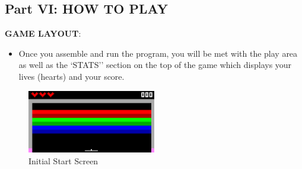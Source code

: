 \documentclass{article}
\begin{document}
\begin{enumerate}
\newpage
\section{Part VI: HOW TO PLAY}

\textbf{GAME LAYOUT}:
\begin{itemize}
    \item Once you assemble and run the program, you will be met with the play area as well as the `STATS'' section on the top of the game which displays your lives (hearts) and your score.
\end{itemize}

\begin{figure}[ht!]
    \centering
    \includegraphics[width=0.5\textwidth]{game_start.png}
    \caption{Initial Start Screen}
    \label{f:Initial Start Screen}
\end{figure}


\end{enumerate}
\end{document}

